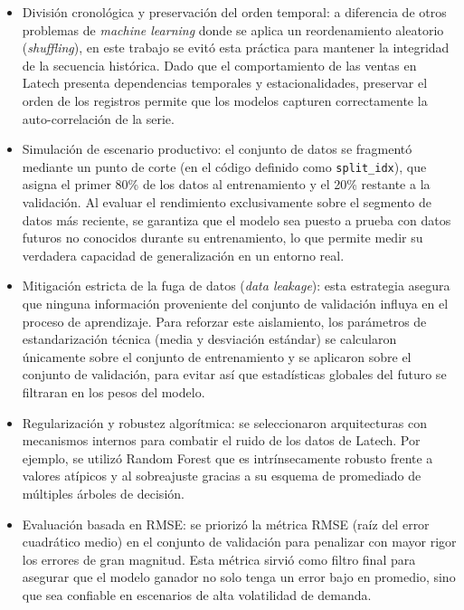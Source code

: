 \begin{itemize}

	\item División cronológica y preservación del orden temporal: a diferencia de otros problemas de \textit{machine learning} donde se aplica un reordenamiento aleatorio (\textit{shuffling}), en este trabajo se evitó esta práctica para mantener la integridad de la secuencia histórica. Dado que el comportamiento de las ventas en Latech presenta dependencias temporales y estacionalidades, preservar el orden de los registros permite que los modelos capturen correctamente la auto-correlación de la serie.


	\item Simulación de escenario productivo: el conjunto de datos se fragmentó mediante un punto de corte (en el código definido como \texttt{split\_idx}), que asigna el primer 80\% de los datos al entrenamiento y el 20\% restante a la validación. Al evaluar el rendimiento exclusivamente sobre el segmento de datos más reciente, se garantiza que el modelo sea puesto a prueba con datos futuros no conocidos durante su entrenamiento, lo que permite medir su verdadera capacidad de generalización en un entorno real.
	
	\item Mitigación estricta de la fuga de datos (\textit{data leakage}): esta estrategia asegura que ninguna información proveniente del conjunto de validación influya en el proceso de aprendizaje. Para reforzar este aislamiento, los parámetros de estandarización técnica (media y desviación estándar) se calcularon únicamente sobre el conjunto de entrenamiento y se aplicaron sobre el conjunto de validación, para evitar así que estadísticas globales del futuro se filtraran en los pesos del modelo.
	
	
	\item Regularización y robustez algorítmica: se seleccionaron arquitecturas con mecanismos internos para combatir el ruido de los datos de Latech. Por ejemplo, se utilizó Random Forest que es intrínsecamente robusto frente a valores atípicos y al sobreajuste gracias a su esquema de promediado de múltiples árboles de decisión.
	
	\item Evaluación basada en RMSE: se priorizó la métrica RMSE (raíz del error cuadrático medio) en el conjunto de validación para penalizar con mayor rigor los errores de gran magnitud. Esta métrica sirvió como filtro final para asegurar que el modelo ganador no solo tenga un error bajo en promedio, sino que sea confiable en escenarios de alta volatilidad de demanda.

\end{itemize}




